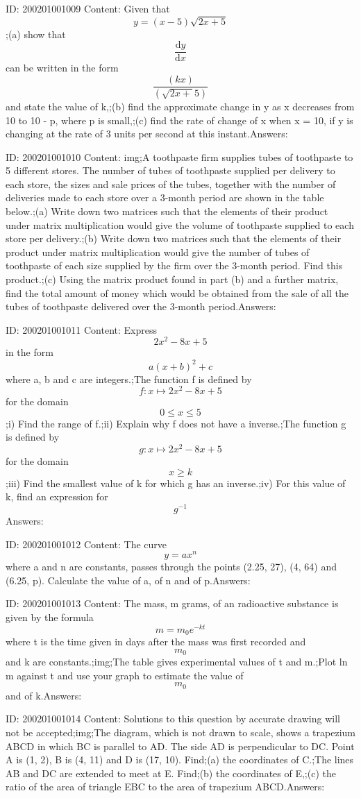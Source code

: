 \documentclass{article}
\begin{document}
ID: 200201001009
Content:
Given that $$y=(x-5)\sqrt{2x+5}$$;(a)	show that $$ \frac{\mathrm{d} y}{\mathrm{d} x}$$ can be written in the form $$\frac{(kx)}{(\sqrt{2x+}5)}$$ and state the value of k,;(b)	find the approximate change in y as x decreases from 10 to 10 - p, where p is small,;(c)	find the rate of change of x when x = 10, if y is changing at the rate of 3 units per second at this instant.Answers:

ID: 200201001010
Content:
img;A toothpaste firm supplies tubes of toothpaste to 5 different stores. The number of tubes of toothpaste supplied per delivery to each store, the sizes and sale prices of the tubes, together with the number of deliveries made to each store over a 3-month period are shown in the table below.;(a)	Write down two matrices such that the elements of their product under matrix multiplication would give the volume of toothpaste supplied to each store per delivery.;(b)	Write down two matrices such that the elements of their product under matrix multiplication would give the number of tubes of toothpaste of each size supplied by the firm over the 3-month period. Find this product.;(c)	Using the matrix product found in part (b) and a further matrix, find the total amount of money which would be obtained from the sale of all the tubes of toothpaste delivered over the 3-month period.Answers:

ID: 200201001011
Content:
Express $$2x^2-8x+5$$ in the form $$a(x+b)^2+c$$ where a, b and c are integers.;The function f is defined by $$f: x \mapsto2x^2-8x+5$$ for the domain $$0\leq x\leq 5$$;i) Find the range of f.;ii) Explain why f does not have a inverse.;The function g is defined by $$g: x \mapsto2x ^2-8x+5$$ for the domain $$x\geq k$$;iii) Find the smallest value of k for which g has an inverse.;iv) For this value of k, find an expression for $$g^{-1}$$Answers:

ID: 200201001012
Content:
The curve $$y=ax^n$$ where a and n are constants, passes through the points (2.25, 27), (4, 64) and (6.25, p). Calculate the value of a, of n and of p.Answers:

ID: 200201001013
Content:
The mass, m grams, of an radioactive substance is given by the formula $$m=m_0e^{-kt}$$ where t is the time given in days after the mass was first recorded and $$m_0$$ and k are constants.;img;The table gives experimental values of t and m.;Plot ln m against t and use your graph to estimate the value of $$m_0$$ and of k.Answers:

ID: 200201001014
Content:
Solutions to this question by accurate drawing will not be accepted;img;The diagram, which is not drawn to scale, shows a trapezium ABCD in which BC is parallel to AD. The side AD is perpendicular to DC. Point A is (1, 2), B is (4, 11) and D is (17, 10). Find;(a)	the coordinates of C.;The lines AB and DC are extended to meet at E. Find;(b)	the coordinates of E,;(c)	the ratio of the area of triangle EBC to the area of trapezium ABCD.Answers:
\end{document}
